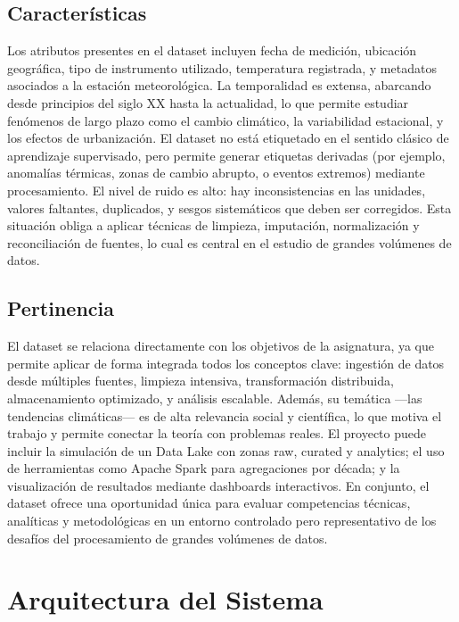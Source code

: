 \documentclass[12pt,a4paper]{scrartcl}
\begin{document}
\subsection{Características}

Los atributos presentes en el dataset incluyen fecha de medición, ubicación geográfica, tipo de instrumento utilizado, temperatura registrada, y metadatos asociados a la estación meteorológica. La temporalidad es extensa, abarcando desde principios del siglo XX hasta la actualidad, lo que permite estudiar fenómenos de largo plazo como el cambio climático, la variabilidad estacional, y los efectos de urbanización. El dataset no está etiquetado en el sentido clásico de aprendizaje supervisado, pero permite generar etiquetas derivadas (por ejemplo, anomalías térmicas, zonas de cambio abrupto, o eventos extremos) mediante procesamiento. El nivel de ruido es alto: hay inconsistencias en las unidades, valores faltantes, duplicados, y sesgos sistemáticos que deben ser corregidos. Esta situación obliga a aplicar técnicas de limpieza, imputación, normalización y reconciliación de fuentes, lo cual es central en el estudio de grandes volúmenes de datos.

\subsection{Pertinencia}

El dataset se relaciona directamente con los objetivos de la asignatura, ya que permite aplicar de forma integrada todos los conceptos clave: ingestión de datos desde múltiples fuentes, limpieza intensiva, transformación distribuida, almacenamiento optimizado, y análisis escalable. Además, su temática —las tendencias climáticas— es de alta relevancia social y científica, lo que motiva el trabajo y permite conectar la teoría con problemas reales. El proyecto puede incluir la simulación de un Data Lake con zonas raw, curated y analytics; el uso de herramientas como Apache Spark para agregaciones por década; y la visualización de resultados mediante dashboards interactivos. En conjunto, el dataset ofrece una oportunidad única para evaluar competencias técnicas, analíticas y metodológicas en un entorno controlado pero representativo de los desafíos del procesamiento de grandes volúmenes de datos.


\section{Arquitectura del Sistema}
\end{document}
